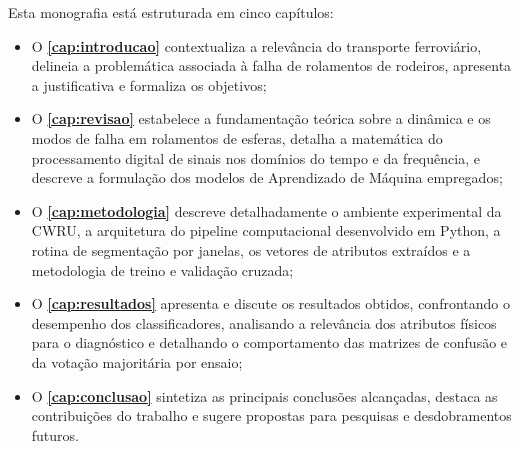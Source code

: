 Esta monografia está estruturada em cinco capítulos:
\begin{itemize}
    \item O \textbf{\autoref{cap:introducao}} contextualiza a relevância do transporte ferroviário, delineia a problemática associada à falha de rolamentos de rodeiros, apresenta a justificativa e formaliza os objetivos;
    \item O \textbf{\autoref{cap:revisao}} estabelece a fundamentação teórica sobre a dinâmica e os modos de falha em rolamentos de esferas, detalha a matemática do processamento digital de sinais nos domínios do tempo e da frequência, e descreve a formulação dos modelos de Aprendizado de Máquina empregados;
    \item O \textbf{\autoref{cap:metodologia}} descreve detalhadamente o ambiente experimental da CWRU, a arquitetura do pipeline computacional desenvolvido em Python, a rotina de segmentação por janelas, os vetores de atributos extraídos e a metodologia de treino e validação cruzada;
    \item O \textbf{\autoref{cap:resultados}} apresenta e discute os resultados obtidos, confrontando o desempenho dos classificadores, analisando a relevância dos atributos físicos para o diagnóstico e detalhando o comportamento das matrizes de confusão e da votação majoritária por ensaio;
    \item O \textbf{\autoref{cap:conclusao}} sintetiza as principais conclusões alcançadas, destaca as contribuições do trabalho e sugere propostas para pesquisas e desdobramentos futuros.
\end{itemize}
